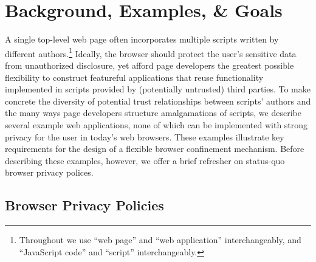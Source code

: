 \section{Background, Examples, \& Goals}

A single top-level web page often incorporates multiple scripts
written by different authors.\footnote{Throughout we use ``web page''
  and ``web application'' interchangeably, and ``JavaScript code'' and
  ``script'' interchangeably.}
Ideally, the browser should protect the
user's sensitive data from unauthorized disclosure, yet afford page
developers the greatest possible flexibility to construct %
featureful applications that reuse functionality implemented in
scripts provided by (potentially untrusted) third parties. To make
concrete the diversity of potential trust relationships between
scripts' authors and the many ways page developers structure
amalgamations of scripts, we describe several example web
applications, none of which can be implemented with strong privacy for
the user in today's web browsers. These examples illustrate key
requirements for the design of a flexible browser confinement
mechanism. Before describing these examples, however, we offer a brief
refresher on status-quo browser privacy polices.

\subsection{Browser Privacy Policies}
\label{sec:backgd}

